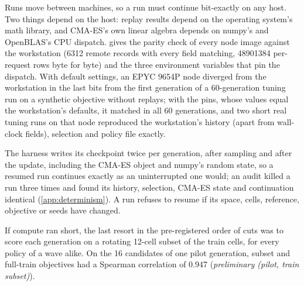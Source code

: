 Runs move between machines, so a run must continue bit-exactly on any host. Two things depend on
the host: replay results depend on the operating system's math library, and CMA-ES's own linear
algebra depends on numpy's and OpenBLAS's CPU dispatch.  gives the parity check of
every node image against the workstation (\num{6312} remote records with every field matching,
\num{48901384} per-request rows byte for byte) and the three environment variables that pin the
dispatch. With default settings, an EPYC 9654P node diverged from the workstation in the last bits
from the first generation of a 60-generation tuning run on a synthetic objective without replays;
with the pins, whose values equal the workstation's defaults, it matched in all 60 generations, and
two short real tuning runs on that node reproduced the workstation's history (apart from wall-clock
fields), selection and policy file exactly.

The harness writes its checkpoint twice per generation, after sampling and after the update,
including the CMA-ES object and numpy's random state, so a resumed run continues exactly as an
uninterrupted one would; an audit killed a run three times and found its history, selection,
CMA-ES state and continuation identical (\cref{app:determinism}). A run refuses to resume if its
space, cells, reference, objective or seeds have changed.

If compute ran short, the last resort in the pre-registered order of cuts was to score each
generation on a rotating 12-cell subset of the train cells, for every policy of a wave alike. On the
16 candidates of one pilot generation, subset and full-train objectives had a Spearman correlation
of 0.947 (\emph{preliminary (pilot, train subset)}).
